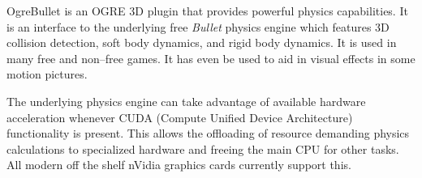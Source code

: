 

\startitemize[4]

OgreBullet is an OGRE 3D plugin that provides powerful physics capabilities. It is an interface to the underlying free {\it Bullet} physics engine which features 3D collision detection, soft body dynamics, and rigid body dynamics. It is used in many free and non--free games. It has even be used to aid in visual effects in some motion pictures. 

The underlying physics engine can take advantage of available hardware acceleration whenever CUDA (Compute Unified Device Architecture) functionality is present. This allows the offloading of resource demanding physics calculations to specialized hardware and freeing the main CPU for other tasks. All modern off the shelf nVidia graphics cards currently support this.
\stopitemize

